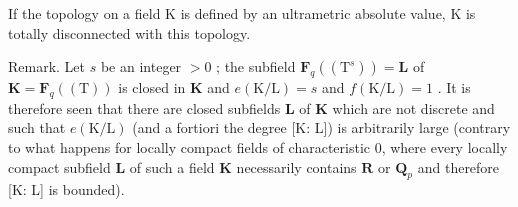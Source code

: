 If the topology on a field K is defined by an ultrametric absolute value, K is totally disconnected with this topology.

Remark. Let \(s\) be an integer \(>0\) ; the subfield \(\mathbf{F}_{q}((\mathrm{T}^{s})) = \mathbf{L}\) of \(\mathbf{K} = \mathbf{F}_{q}((\mathrm{T}))\) is closed in \(\mathbf{K}\) and \(e(\mathrm{K/L}) = s\) and \(f(\mathrm{K/L}) = 1\) . It is therefore seen that there are closed subfields \(\mathbf{L}\) of \(\mathbf{K}\) which are not discrete and such that \(e(\mathrm{K/L})\) (and a fortiori the degree {[}K: L{]}) is arbitrarily large (contrary to what happens for locally compact fields of characteristic 0, where every locally compact subfield \(\mathbf{L}\) of such a field \(\mathbf{K}\) necessarily contains \(\mathbf{R}\) or \(\mathbf{Q}_{p}\) and therefore {[}K: L{]} is bounded).

